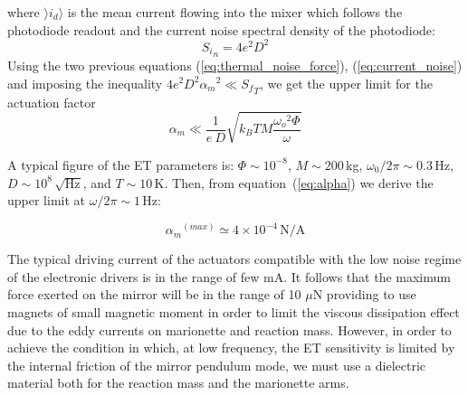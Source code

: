 where $\rangle i_d \rangle$ is the mean current flowing into the mixer which follows the photodiode readout and the current noise spectral density of the photodiode:
 \begin{equation}
 {{S_i}_n} = 4 e^2 D^2
\label{eq:current_noise}
\end{equation}
Using  the two previous equations (\ref{eq:thermal_noise_force}), (\ref{eq:current_noise}) and  imposing the inequality  $ 4 e^2 D^2  {\alpha_m}^2 \ll {S_f}_T  $, 
we get the  upper limit for the actuation factor
\begin{equation}
\alpha_m \ll \frac{1}{e~D}\sqrt{ k_B T M \frac{ {\omega_o}^2 \Phi}{\omega }  } 
\label{eq:alpha}
\end{equation}

\noindent
A typical figure of the ET parameters  is:
 $\Phi \sim  10^{-8}$, $M \sim 200$\,kg, $\omega_0/ 2 \pi \sim 0.3$\,Hz, $D\sim 10^8 \, \sqrt{\mathrm{Hz}}$, and $T \sim 10$\,K. Then, from equation~(\ref{eq:alpha}) we derive the upper limit at $\omega/2\pi \sim 1$\,Hz:

\begin{equation}
 {\alpha_m}^{(max)} \simeq 4 \times 10^{-4} \, \mathrm{N/A} 
 \label{eq:alpha_m}
 \end{equation}

The typical driving current of the actuators compatible with the low  noise regime of the electronic drivers is in the range of few mA. It follows that the maximum force exerted on the mirror will be in the range of 10 $\mu$N providing to use   magnets of  small magnetic moment  in order to limit the viscous dissipation effect due to the eddy currents on marionette and  reaction mass. However, in order to achieve the condition in which, at low frequency, the ET  sensitivity is limited by the internal friction of the mirror pendulum mode, we must use a dielectric material both for the reaction mass and the marionette arms.

